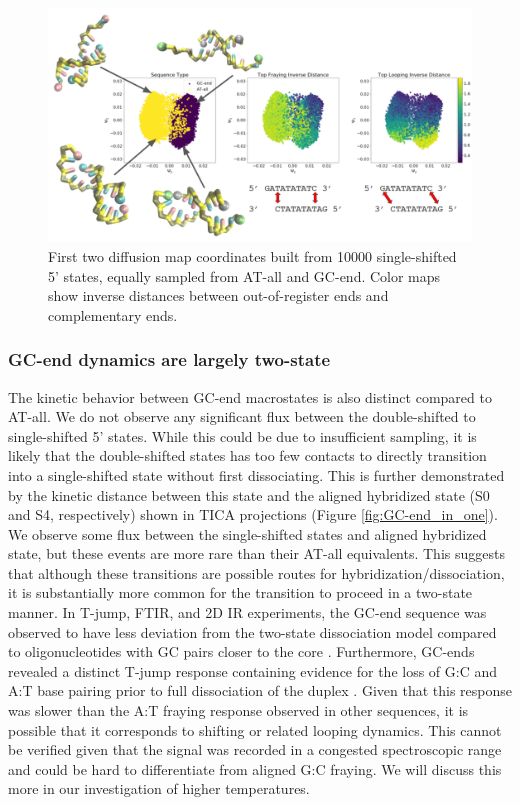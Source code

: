 \documentclass[journal=jpcbfk,manuscript=article]{achemso}
\begin{document}
\begin{figure}[ht!]
	\begin{center}
        \includegraphics[width=\textwidth]{Figs/figs_0804/GC-end_dmaps.png}
        \caption{First two diffusion map coordinates built from 10000 single-shifted 5' states, equally sampled from AT-all and GC-end. Color maps show inverse distances between out-of-register ends and complementary ends. }
        \label{fig:GC-end_dmaps}
	\end{center}
\end{figure}


\subsubsection{GC-end dynamics are largely two-state}

The kinetic behavior between GC-end macrostates is also distinct compared to AT-all. We do not observe any significant flux between the double-shifted to single-shifted 5' states. While this could be due to insufficient sampling, it is likely that the double-shifted states has too few contacts to directly transition into a single-shifted state without first dissociating. This is further demonstrated by the kinetic distance between this state and the aligned hybridized state (S0 and S4, respectively) shown in TICA projections (Figure \ref{fig:GC-end_in_one}). We observe some flux between the single-shifted states and aligned hybridized state, but these events are more rare than their AT-all equivalents. This suggests that although these transitions are possible routes for hybridization/dissociation, it is substantially more common for the transition to proceed in a two-state manner. In T-jump, FTIR, and 2D IR experiments, the GC-end sequence was observed to have less deviation from the two-state dissociation model compared to oligonucleotides with GC pairs closer to the core \citep{Sanstead2016}. Furthermore, GC-ends revealed a distinct T-jump response containing evidence for the loss of G:C and A:T base pairing prior to full dissociation of the duplex \citep{Sanstead2018DirectDehybridization}. Given that this response was slower than the A:T fraying response observed in other sequences, it is possible that it corresponds to shifting or related looping dynamics. This cannot be verified given that the signal was recorded in a congested spectroscopic range and could be hard to differentiate from aligned G:C fraying. We will discuss this more in our investigation of higher temperatures.
\end{document}
